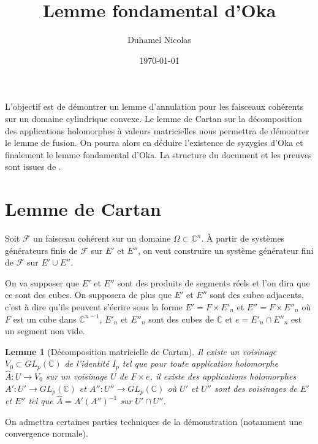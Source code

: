 \documentclass{article}
\newtheorem{lemme}[theoreme]{Lemme}
\theoremstyle{definition}
\theoremstyle{remark}
\begin{document}
\title{Lemme fondamental d'Oka}
\date \today
\author{Duhamel Nicolas}
\maketitle

L'objectif est de démontrer un lemme d'annulation pour les faisceaux cohérents sur un domaine cylindrique convexe. Le lemme de Cartan sur la décomposition des applications holomorphes à valeurs matricielles nous permettra de démontrer le lemme de fusion. On pourra alors en déduire l'existence de syzygies d'Oka et finalement le lemme fondamental d'Oka. La structure du document et les preuves sont issues de \cite{noguchi}.

\section{Lemme de Cartan}
Soit $\mathcal{F}$ un faisceau cohérent sur un domaine $\Omega \subset \mathbb{C}^n$. À partir de systèmes générateurs finis de $\mathcal{F}$ sur $E'$ et $E''$, on veut construire un système générateur fini de $\mathcal{F}$ sur $E' \cup E''$.

On va supposer que $E'$ et $E''$ sont des produits de segments réels et l'on dira que ce sont des cubes. On supposera de plus que $E'$ et $E''$ sont des cubes adjacents, c'est à dire qu'ils peuvent s'écrire sous la forme $E'=F \times E'_n$ et $E''=F \times E''_n$ où $F$ est un cube dans $\mathbb{C}^{n-1}$, $E'_n$ et $E''_n$ sont des cubes de $\mathbb{C}$ et $e=E'_n \cap E''_n$ est un segment non vide.

\begin{lemme}[Décomposition matricielle de Cartan]
Il existe un voisinage $V_0 \subset GL_p(\mathbb{C})$ de l'identité $I_p$ tel que pour toute application holomorphe $\hat{A} : U \to V_0$ sur un voisinage $U$ de $F \times e$, il existe des applications holomorphes $A' : U' \to GL_p(\mathbb{C})$ et $A'' : U'' \to GL_p(\mathbb{C})$ où $U'$ et $U''$ sont des voisinages de $E'$ et $E''$ tel que $\hat{A} = A'(A'')^{-1}$ sur $U' \cap U''$.
\end{lemme}

On admettra certaines parties techniques de la démonstration (notamment une convergence normale).
\end{document}
